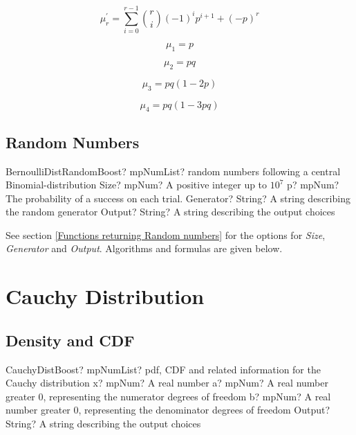 \begin{equation} 
	\mu_r^{'} = \sum_{i=0}^{r-1} \binom{r}{i}  (-1)^i p^{i+1} + (-p)^r
\end{equation}

\begin{equation} 
	\mu_1 = p
\end{equation}

\begin{equation} 
	\mu_2 = pq
\end{equation}

\begin{equation} 
	\mu_3 = pq(1-2p)
\end{equation}

\begin{equation} 
	\mu_4 = pq (1-3pq)
\end{equation}



\subsection{Random Numbers}
\begin{mpFunctionsExtract}
	\mpFunctionFourNotImplemented
	{BernoulliDistRandomBoost? mpNumList? random numbers following a central Binomial-distribution}
	{Size? mpNum? A positive integer up to $10^7$}
	{p? mpNum? The probability of a success on each trial.}
	{Generator? String? A string describing the random generator}
	{Output? String? A string describing the output choices}
\end{mpFunctionsExtract}

\vspace{0.3cm}

See section \ref{Functions returning Random numbers} for the options for  {\itshape\sffamily Size},  {\itshape\sffamily Generator} and {\itshape\sffamily Output}. Algorithms and formulas are given below.




\newpage
\section{Cauchy Distribution}
\label{CauchyDistribution}



\subsection{Density and CDF}

\begin{mpFunctionsExtract}
	\mpFunctionFourNotImplemented
	{CauchyDistBoost? mpNumList? pdf, CDF and related information for the Cauchy distribution}
	{x? mpNum? A real number}
	{a? mpNum? A real number greater 0, representing the numerator  degrees of freedom}
	{b? mpNum? A real number greater 0, representing the denominator degrees of freedom}
	{Output? String? A string describing the output choices}
\end{mpFunctionsExtract}


